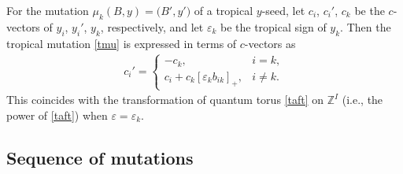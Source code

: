 \documentclass[11pt]{article}
\numberwithin{equation}{section}
\newcommand{\Z}{{\mathbb Z}}
\def\ve{{\varepsilon}}
\numberwithin{equation}{section}
\begin{document}
\begin{Remark}\label{re:sgni}
For the mutation $\mu_k (B,y) = \bigl(B',y'\bigr)$ of a tropical $y$-seed,
let $c_i$, $c_i'$, $c_k$ be the $c$-vectors of $y_i$, $y_i'$, $y_k$, respectively,
and let $\ve_k$ be the tropical sign of $y_k$.
Then the tropical mutation \eqref{tmu} is expressed in terms of $c$-vectors as
\begin{align*}
 c_i' =
 \begin{cases}
 -c_k, & i=k,
 \\
 c_i + c_k [\ve_k b_{ik}]_+, & i \neq k.
\end{cases}
\end{align*}
This coincides with the transformation of quantum torus \eqref{taft}
on $\Z^I$ (i.e., the power of \eqref{taft}) when $\ve = \ve_k$.
\end{Remark}

\subsection{Sequence of mutations}
\end{document}

